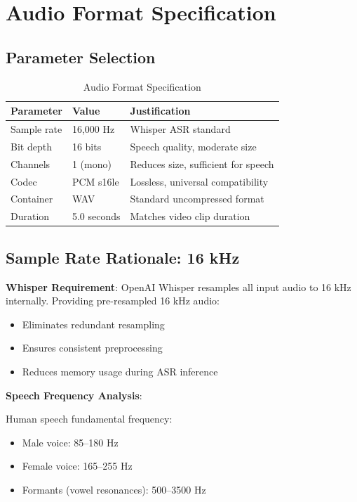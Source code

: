 \documentclass[11pt,a4paper]{article}
\begin{document}
\section{Audio Format Specification}

\subsection{Parameter Selection}

\begin{table}[htbp]
\centering
\caption{Audio Format Specification}
\begin{tabular}{@{}lll@{}}
\toprule
\textbf{Parameter} & \textbf{Value} & \textbf{Justification} \\ \midrule
Sample rate & 16,000 Hz & Whisper ASR standard \\
Bit depth & 16 bits & Speech quality, moderate size \\
Channels & 1 (mono) & Reduces size, sufficient for speech \\
Codec & PCM s16le & Lossless, universal compatibility \\
Container & WAV & Standard uncompressed format \\
Duration & 5.0 seconds & Matches video clip duration \\
\bottomrule
\end{tabular}
\end{table}

\subsection{Sample Rate Rationale: 16 kHz}

\textbf{Whisper Requirement}: OpenAI Whisper resamples all input audio to 16 kHz internally. Providing pre-resampled 16 kHz audio:
\begin{itemize}
    \item Eliminates redundant resampling
    \item Ensures consistent preprocessing
    \item Reduces memory usage during ASR inference
\end{itemize}

\textbf{Speech Frequency Analysis}:

Human speech fundamental frequency:
\begin{itemize}
    \item Male voice: 85--180 Hz
    \item Female voice: 165--255 Hz
    \item Formants (vowel resonances): 500--3500 Hz
\end{itemize}
\end{document}
